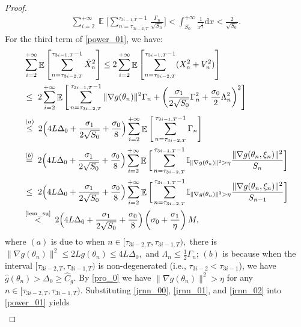 \documentclass[standalone]{article}
\newcommand{\I}{\mathbb{I}}
\DeclareMathOperator{\Expect}{\mathbb{E}}
\begin{document}
\begin{proof}
\begin{align}
\sum_{i=2}^{+\infty}\Expect\Bigg[\sum_{n=\tau_{3i-2,T}}^{\tau_{3i-1,T}-1}\frac{\Gamma_{n}}{\sqrt{S_{n}}}\Bigg]<\int_{S_{0}}^{+\infty}\frac{1}{x^{\frac{3}{2}}}\text{d}x<\frac{2}{\sqrt{S_{0}}}.
\end{align}
For the third term of \cref{power_01}, we have:
\begin{align}\label{jrnn_02}
& \sum_{i=2}^{+\infty}\Expect\left[ \sum_{n=\tau_{3i-2,T}}^{\tau_{3i-1,T}-1}\hat{X}_{n}^{2}\right] \le 2\sum_{i=2}^{+\infty}\Expect\left[\sum_{n=\tau_{3i-2,T}}^{\tau_{3i-1,T}-1}(X_{n}^{2}+V_{n}^{2})\right]\notag\\& \le\ 2\sum_{i=2}^{+\infty}\Expect\Bigg[\sum_{n=\tau_{3i-2,T}}^{\tau_{3i-1,T}-1}\|\nabla g(\theta_{n})\|^{2}\Gamma_{n}+\bigg(\frac{\sigma_{1}}{2\sqrt{S_{0}}}\Gamma^{2}_{n}+\frac{\sigma_{0}}{2}\Lambda_{n}^{2}\bigg)^{2}\Bigg]\notag\\ & \mathop{\leq}^{(a)}\ 2\Big(4{ L\Delta_0}+\frac{\sigma_{1}}{2\sqrt{S_{0}}}+\frac{\sigma_{0}}{8}\Big)\sum_{i=2}^{+\infty}\Expect\Bigg[\sum_{n=\tau_{3i-2,T}}^{\tau_{3i-1,T}-1}\Gamma_{n}\Bigg]\notag\\ &\mathop{=}^{(b)}\ 2\Big(4{ L\Delta_0}+\frac{\sigma_{1}}{2\sqrt{S_{0}}}+\frac{\sigma_{0}}{8}\Big)\sum_{i=2}^{+\infty}\Expect\bigg[\sum_{n=\tau_{3i-2,T}}^{\tau_{3i-1,T}-1}\I_{\|\nabla g(\theta_{n})\|^{2}>\eta}\frac{\|\nabla g(\theta_{n},\xi_{n})\|^{2}}{{S_{n}}} \bigg]\notag\\
& \leq \ 2\Big(4{ L\Delta_0}+\frac{\sigma_{1}}{2\sqrt{S_{0}}}+\frac{\sigma_{0}}{8}\Big)\sum_{i=2}^{+\infty}\Expect\bigg[\sum _{n=\tau_{3i-2,T}}^{\tau_{3i-1,T}-1}\I_{\|\nabla g(\theta_{n})\|^{2}>\eta}\frac{\|\nabla g(\theta_{n},\xi_{n})\|^{2}}{{S_{n-1}}} \bigg]\notag\\
&\mathop{<}^{\text{\cref{lem_su}}}\ 2\Big(4{ L\Delta_0}+\frac{\sigma_{1}}{2\sqrt{S_{0}}}+\frac{\sigma_{0}}{8}\Big) \left(\sigma_0 + \frac{\sigma_1}{\eta} \right)M,
\end{align}
where $(a)$ is due to when $n\in[\tau_{3i-2,T},\tau_{3i-1,T}),$ there is $\|\nabla g(\theta_{n})\|^{2} \leq 2 Lg(\theta_n) \leq  {4 L\Delta_0},$ and $\Lambda_{n}\le \frac{1}{2}\Gamma_{n}$; $(b)$ is because when the interval $[\tau_{3i-2,T}, \tau_{3i-1,T})$ is non-degenerated (i.e., $\tau_{3i-2} < \tau_{3i-1}$), we have $\hat{g}(\theta_{n}) > \Delta_0 \geq \hat{C}_{g}$. By \cref{pro_0} we have $\|\nabla g(\theta_{n})\|^{2} > \eta$ for any $n \in [\tau_{3i-2,T}, \tau_{3i-1,T})$. Substituting \cref{jrnn_00}, \cref{jrnn_01}, and \cref{jrnn_02} into \cref{power_01} yields
\begin{equation}\nonumber\begin{aligned}

\end{aligned}
\end{equation}
\end{proof}
\end{document}
